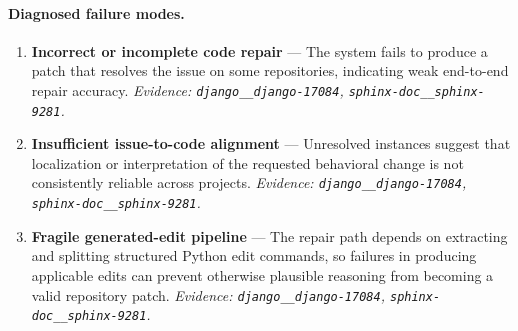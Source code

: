 \paragraph{Diagnosed failure modes.}\begin{enumerate}\itemsep1pt
\item \textbf{Incorrect or incomplete code repair} --- The system fails to produce a patch that resolves the issue on some repositories, indicating weak end-to-end repair accuracy. \emph{Evidence: \texttt{django\_\_django-17084}, \texttt{sphinx-doc\_\_sphinx-9281}.}
\item \textbf{Insufficient issue-to-code alignment} --- Unresolved instances suggest that localization or interpretation of the requested behavioral change is not consistently reliable across projects. \emph{Evidence: \texttt{django\_\_django-17084}, \texttt{sphinx-doc\_\_sphinx-9281}.}
\item \textbf{Fragile generated-edit pipeline} --- The repair path depends on extracting and splitting structured Python edit commands, so failures in producing applicable edits can prevent otherwise plausible reasoning from becoming a valid repository patch. \emph{Evidence: \texttt{django\_\_django-17084}, \texttt{sphinx-doc\_\_sphinx-9281}.}
\end{enumerate}
